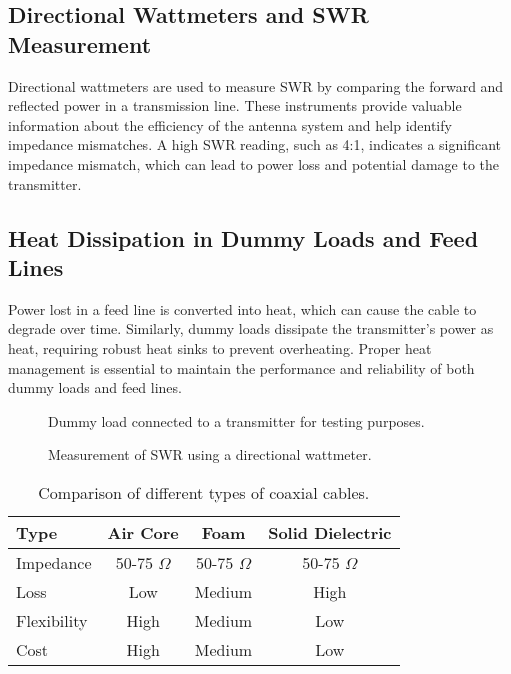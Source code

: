 \subsection*{Directional Wattmeters and SWR Measurement}
Directional wattmeters are used to measure SWR by comparing the forward and reflected power in a transmission line. These instruments provide valuable information about the efficiency of the antenna system and help identify impedance mismatches. A high SWR reading, such as 4:1, indicates a significant impedance mismatch, which can lead to power loss and potential damage to the transmitter.

\subsection*{Heat Dissipation in Dummy Loads and Feed Lines}
Power lost in a feed line is converted into heat, which can cause the cable to degrade over time. Similarly, dummy loads dissipate the transmitter's power as heat, requiring robust heat sinks to prevent overheating. Proper heat management is essential to maintain the performance and reliability of both dummy loads and feed lines.

\begin{figure}[h]
    \centering
    \caption{Dummy load connected to a transmitter for testing purposes.}
    \label{fig:dummy_load}
\end{figure}

\begin{figure}[h]
    \centering
    \caption{Measurement of SWR using a directional wattmeter.}
    \label{fig:swr_measurement}
\end{figure}

\begin{table}[h]
    \centering
    \caption{Comparison of different types of coaxial cables.}
    \label{tab:coaxial_cable_comparison}
    \begin{tabular}{|l|c|c|c|}
        \hline
        \textbf{Type} & \textbf{Air Core} & \textbf{Foam} & \textbf{Solid Dielectric} \\
        \hline
        Impedance & 50-75 $\Omega$ & 50-75 $\Omega$ & 50-75 $\Omega$ \\
        Loss & Low & Medium & High \\
        Flexibility & High & Medium & Low \\
        Cost & High & Medium & Low \\
        \hline
    \end{tabular}
\end{table}

